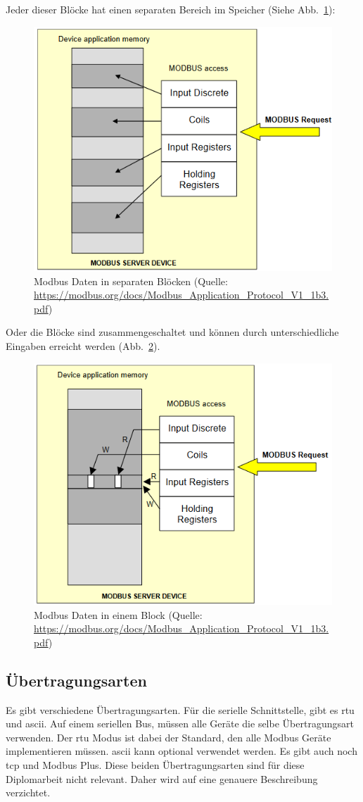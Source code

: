 Jeder dieser Blöcke hat einen separaten Bereich im Speicher (Siehe Abb.~\ref{fig:modbus_register_many_blocks}):
\begin{figure}[H]
	\centering
	\includegraphics[width=0.4\linewidth]{Bilder/Modbus_Data_Model_with_separate_block}
	\caption{Modbus Daten in separaten Blöcken (Quelle: \url{https://modbus.org/docs/Modbus_Application_Protocol_V1_1b3.pdf})}
	\label{fig:modbus_register_many_blocks}
\end{figure}

Oder die Blöcke sind zusammengeschaltet und können durch unterschiedliche Eingaben erreicht werden (Abb.~\ref{fig:modbus_register_one_block}).
\begin{figure}[H]
	\centering
	\includegraphics[width=0.4\linewidth]{Bilder/Modbus_Data_Model_with_one_block}
	\caption{Modbus Daten in einem Block (Quelle: \url{https://modbus.org/docs/Modbus_Application_Protocol_V1_1b3.pdf})}
	\label{fig:modbus_register_one_block}
\end{figure}

\subsection{Übertragungsarten}
Es gibt verschiedene Übertragungsarten. Für die serielle Schnittstelle, gibt es \acf{rtu} und \acf{ascii}. Auf einem seriellen Bus, müssen alle Geräte die selbe Übertragungsart verwenden. Der \acs{rtu} Modus ist dabei der Standard, den alle Modbus Geräte implementieren müssen. \acs{ascii} kann optional verwendet werden. \newline Es gibt auch noch \acs{tcp} und Modbus Plus. Diese beiden Übertragungsarten sind für diese Diplomarbeit nicht relevant. Daher wird auf eine genauere Beschreibung verzichtet.


